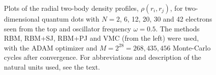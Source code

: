 \begin{landscape}
\begin{figure}
		\caption{Plots of the radial two-body density profiles, $\rho(r_i, r_j)$, for two-dimensional quantum dots with $N=2$, 6, 12, 20, 30 and 42 electrons seen from the top and oscillator frequency $\omega=0.5$. The methods RBM, RBM+SJ, RBM+PJ and VMC (from the left) were used, with the ADAM optimizer and $M=2^{28}=268,435,456$ Monte-Carlo cycles after convergence. For abbreviations and description of the natural units used, see the text.}%
		\label{fig:TB_2D_0p5w}
	\end{figure}
	\begin{figure}
		\centering
		\captionsetup[subfigure]{labelformat=empty}
		\hspace{0.1cm}
		\\
		

\end{figure}
\end{landscape}
